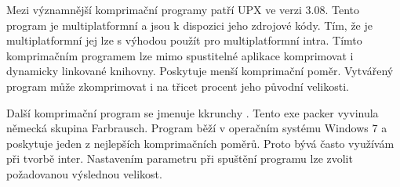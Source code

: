 Mezi významnější komprimační programy patří UPX \cite{UPX} ve verzi 3.08.
Tento program je multiplatformní a jsou k dispozici jeho zdrojové kódy.
Tím, že je multiplatformní jej lze s výhodou použít pro multiplatformní intra.
Tímto komprimačním programem lze mimo spustitelné aplikace komprimovat i dynamicky linkované knihovny.
Poskytuje menší komprimační poměr.
Vytvářený program může zkomprimovat i na třicet procent jeho původní velikosti.

Další komprimační program se jmenuje kkrunchy \cite{KKRUNCHY}.
Tento exe packer vyvinula německá skupina Farbrausch.
Program běží v operačním systému Windows 7 a poskytuje jeden z nejlepších komprimačních poměrů.
Proto bývá často využívám při tvorbě inter.
Nastavením parametru při spuštění programu lze zvolit požadovanou výslednou velikost.

